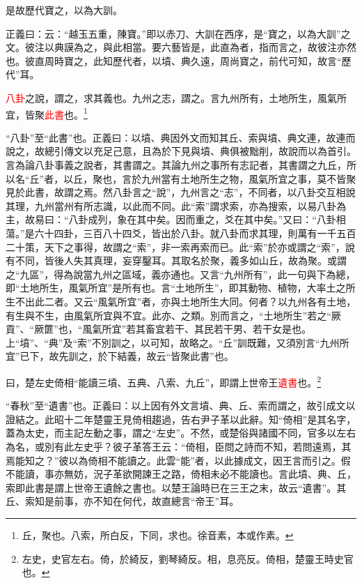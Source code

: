 是故歷代寶之，以為大訓。

{\noindent\shu{}\fzkt 正義曰：云：“越玉五重，陳寶。”即以赤刀、大訓在西序，是“寶之，以為大訓”之文。彼注以典謨為之，與此相當。要六藝皆是，此直為者，指而言之，故彼注亦然也。彼直周時寶之，此知歷代者，以墳、典久遠，周尚寶之，前代可知，故言“歷代”耳。 \par}

\textcolor{red}{八卦}之說，謂之，求其義也。九州之志，謂之。言九州所有，土地所生，風氣所宜，皆聚\textcolor{red}{此書}也。\footnote{丘，聚也。八索，所白反，下同，求也。徐音素，本或作素。}

{\noindent\shu{}\fzkt “八卦”至“此書”也。正義曰：以墳、典因外文而知其丘、索與墳、典文連，故連而說之，故總引傳文以充足己意，且為於下見與墳、典俱被黜削，故說而以為首引。言為論八卦事義之說者，其書謂之。其論九州之事所有志記者，其書謂之九丘，所以名“丘”者，以丘，聚也，言於九州當有土地所生之物，風氣所宜之事，莫不皆聚見於此書，故謂之焉。然八卦言之“說”，九州言之“志”，不同者，以八卦交互相說其理，九州當州有所志識，以此而不同。此“索”謂求索，亦為搜索，以易八卦為主，故易曰：“八卦成列，象在其中矣。因而重之，爻在其中矣。”又曰：“八卦相蕩。”是六十四卦，三百八十四爻，皆出於八卦。就八卦而求其理，則萬有一千五百二十策，天下之事得，故謂之“索”，非一索再索而已。此“索”於亦或謂之“索”，說有不同，皆後人失其真理，妄穿鑿耳。其取名於聚，義多如山丘，故為聚。或謂之“九區”，得為說當九州之區域，義亦通也。又言“九州所有”，此一句與下為總，即“土地所生，風氣所宜”是所有也。言“土地所生”，即其動物、植物，大率土之所生不出此二者。又云“風氣所宜”者，亦與土地所生大同。何者？以九州各有土地，有生與不生，由風氣所宜與不宜。此亦、之類。別而言之，“土地所生”若之“厥貢”、“厥篚”也，“風氣所宜”若其畜宜若干、其民若干男、若干女是也。上“墳”、“典”及“索”不別訓之，以可知，故略之。“丘”訓既難，又須別言“九州所宜”已下，故先訓之，於下結義，故云“皆聚此書”也。 \par}

曰，楚左史倚相“能讀三墳、五典、八索、九丘”，即謂上世帝王\textcolor{red}{遺書}也。\footnote{左史，史官左右。倚，於綺反，劉琴綺反。相，息亮反。倚相，楚靈王時史官也。}

{\noindent\shu{}\fzkt “春秋”至“遺書”也。正義曰：以上因有外文言墳、典、丘、索而謂之，故引成文以證結之。此昭十二年楚靈王見倚相趨過，告右尹子革以此辭。知“倚相”是其名字，蓋為太史，而主記左動之事，謂之“左史”。不然，或楚俗與諸國不同，官多以左右為名，或別有此左史乎？彼子革答王云：“倚相，臣問之詩而不知，若問遠焉，其焉能知之？”彼以為倚相不能讀之。此雲“能”者，以此據成文，因王言而引之。假不能讀，事亦無妨，況子革欲開諫王之路，倚相未必不能讀也。言此墳、典、丘，索即此書是謂上世帝王遺餘之書也。以楚王論時已在三王之末，故云“遺書”。其丘、索知是前事，亦不知在何代，故直總言“帝王”耳。 \par}

